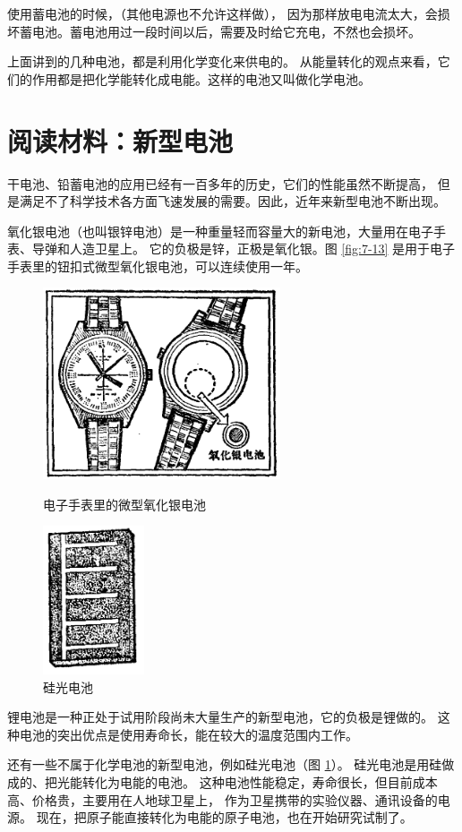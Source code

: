 使用蓄电池的时候，（其他电源也不允许这样做），
因为那样放电电流太大，会损坏蓄电池。蓄电池用过一段时间以后，需要及时给它充电，不然也会损坏。

上面讲到的几种电池，都是利用化学变化来供电的。
从能量转化的观点来看，它们的作用都是把化学能转化成电能。这样的电池又叫做化学电池。


\section*{阅读材料：新型电池}

干电池、铅蓄电池的应用已经有一百多年的历史，它们的性能虽然不断提高，
但是满足不了科学技术各方面飞速发展的需要。因此，近年来新型电池不断出现。

氧化银电池（也叫银锌电池）是一种重量轻而容量\footnotemark 大的新电池，大量用在电子手表、导弹和人造卫星上。
它的负极是锌，正极是氧化银。图 \ref{fig:7-13} 是用于电子手表里的钮扣式微型氧化银电池，可以连续使用一年。

\begin{figure}[htbp]
    \centering
    \begin{minipage}{8cm}
    \centering
    \includegraphics[width=7cm]{../pic/czwl2-ch7-13}
    \caption{电子手表里的微型氧化银电池}\label{fig:7-13}
    \end{minipage}
    \qquad
    \begin{minipage}{6cm}
    \centering
    \includegraphics[width=3cm]{../pic/czwl2-ch7-14}
    \caption{硅光电池}\label{fig:7-14}
    \end{minipage}
\end{figure}


锂电池是一种正处于试用阶段尚未大量生产的新型电池，它的负极是锂做的。
这种电池的突出优点是使用寿命长，能在较大的温度范围内工作。

还有一些不属于化学电池的新型电池，例如硅光电池（图 \ref{fig:7-14}）。
硅光电池是用硅做成的、把光能转化为电能的电池。
这种电池性能稳定，寿命很长，但目前成本高、价格贵，主要用在人地球卫星上，%
作为卫星携带的实验仪器、通讯设备的电源。
现在，把原子能直接转化为电能的原子电池，也在开始研究试制了。

